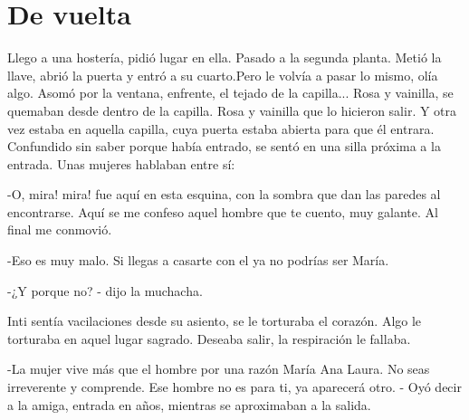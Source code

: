 
\chapter{De vuelta}
Llego a una hostería, pidió lugar en ella. Pasado a la segunda planta. Metió la llave, abrió la puerta y entró a su cuarto.Pero le volvía a pasar lo mismo, olía algo. Asomó por la ventana, enfrente, el tejado de la capilla... Rosa y vainilla, se quemaban desde dentro de la capilla. Rosa y vainilla que lo hicieron salir. Y otra vez estaba en aquella capilla, cuya puerta estaba abierta para que él entrara. Confundido sin saber porque había entrado, se sentó en una silla próxima a la entrada. Unas mujeres hablaban entre sí:

-O, mira! mira! fue aquí en esta esquina, con la sombra que dan las paredes al encontrarse. Aquí se me confeso aquel hombre que te cuento, muy galante. Al final me conmovió.

-Eso es muy malo. Si llegas a casarte con el ya no podrías ser María.

-¿Y porque no? - dijo la muchacha.

Inti sentía vacilaciones desde su asiento, se le torturaba el corazón. Algo le torturaba en aquel lugar sagrado. Deseaba salir, la respiración le fallaba.

-La mujer vive más que el hombre por una razón María Ana Laura. No seas irreverente y comprende. Ese hombre no es para ti, ya aparecerá otro. - Oyó decir a la amiga, entrada en años, mientras se aproximaban a la salida.

